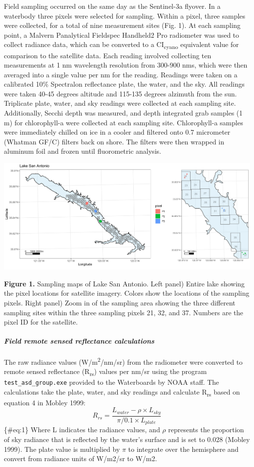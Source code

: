 \documentclass[
]{article}
\begin{document}
Field sampling occurred on the same day as the Sentinel-3a flyover. In a
waterbody three pixels were selected for sampling. Within a pixel, three
samples were collected, for a total of nine measurement sites (Fig. 1).
At each sampling point, a Malvern Panalytical Fieldspec Handheld2 Pro
radiometer was used to collect radiance data, which can be converted to
a CI\textsubscript{cyano} equivalent value for comparison to the
satellite data. Each reading involved collecting ten measurements at 1
nm wavelength resolution from 300-900 nms, which were then averaged into
a single value per nm for the reading. Readings were taken on a
calibrated 10\% Spectralon reflectance plate, the water, and the sky.
All readings were taken 40-45 degrees altitude and 115-135 degrees
alzimuth from the sun. Triplicate plate, water, and sky readings were
collected at each sampling site. Additionally, Secchi depth was
measured, and depth integrated grab samples (1 m) for chlorophyll-a were
collected at each sampling site. Chlorophyll-a samples were immediately
chilled on ice in a cooler and filtered onto 0.7 micrometer (Whatman
GF/C) filters back on shore. The filters were then wrapped in aluminum
foil and frozen until fluorometric analysis.

\includegraphics[width=0.3\linewidth]{../Data/Figures_output/Map_Figure}

\textbf{Figure 1.} Sampling maps of Lake San Antonio. Left panel) Entire
lake showing the pixel locations for satellite imagery. Colors show the
locations of the sampling pixels. Right panel) Zoom in of the sampling
area showing the three different sampling sites within the three
sampling pixels 21, 32, and 37. Numbers are the pixel ID for the
satellite.

\hypertarget{field-remote-sensed-reflectance-calculations}{%
\paragraph{\texorpdfstring{\emph{Field remote sensed reflectance
calculations}}{Field remote sensed reflectance calculations}}\label{field-remote-sensed-reflectance-calculations}}

The raw radiance values (W/m\textsuperscript{2}/nm/sr) from the
radiometer were converted to remote sensed reflectance
(R\textsubscript{rs}) values per nm/sr using the program
\texttt{test\_asd\_group.exe} provided to the Waterboards by NOAA staff.
The calculations take the plate, water, and sky readings and calculate
R\textsubscript{rs} based on equation 4 in Mobley 1999: \[
\begin{equation}
R_{rs} = \frac{L_{water} - \rho \times L_{sky}}{\pi/0.1 \times L_{plate}}
\end{equation}
\] \{\#eq:1\} Where L indicates the radiance values, and \(\rho\)
represents the proportion of sky radiance that is reflected by the
water's surface and is set to 0.028 (Mobley 1999). The plate value is
multiplied by \(\pi\) to integrate over the hemisphere and convert from
radiance units of W/m2/sr to W/m2.
\end{document}
